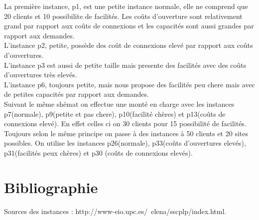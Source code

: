 \documentclass[a4paper]{llncs}
\begin{document}
La première instance, p1, est une petite instance normale, elle ne comprend que 20 clients et 10 possibilite de facilités. Les coûts d'ouverture sont relativement grand par rapport aux coûts de connexions et les capacités sont aussi grandes par rapport aux demandes.\\

L'instance p2, petite, possède des coût de connexions elevé par rapport aux coûts d'ouvertures.\\

L'instance p3 est aussi de petite taille mais presente des facilités avec des coûts d'ouvertures très elevés.\\

L'instance p6, toujours petite, mais nous propose des facilités peu chere mais avec de petites capacités par rapport aux demandes.\\

Suivant le même shémat on effectue une monté en charge avec les instances p7(normale), p9(petite et pas chere), p10(facilité chères) et p13(coûts de connexions elevé). En effet celles ci on 30 clients pour 15 possibilité de facilités.\\

Toujours selon le même principe on passe à des instances à 50 clients et 20 sites possibles. On utilise les instances p26(normale), p33(coûts d'ouvertures elevés), p31(facilités peux chères) et p30 (coûts de connexions elevés).\\

\section*{Bibliographie}
Sources des instances : http://www-eio.upc.es/~elena/sscplp/index.html.\\
\end{document}
